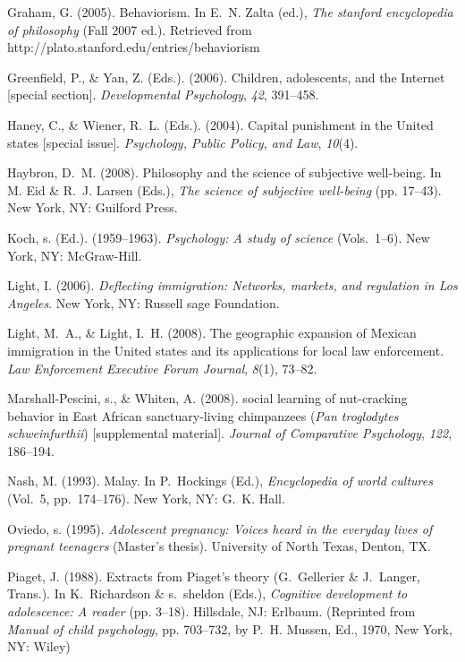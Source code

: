 \documentclass[]{interact}
\theoremstyle{plain}%
\theoremstyle{definition}
\theoremstyle{remark}
\begin{document}
\begin{thebibliography}{}
Graham, G. (2005). Behaviorism. In E.~N. Zalta (ed.), \emph{The stanford
 encyclopedia of philosophy} (Fall 2007 ed.). Retrieved from
 http://plato.stanford.edu/entries/behaviorism

Greenfield, P., \& Yan, Z. (Eds.). (2006). Children, adolescents, and the
 Internet [special section]. \emph{Developmental Psychology}, \emph{42},
 391--458.

Haney, C., \& Wiener, R.~L. (Eds.). (2004). Capital punishment in the United
 states [special issue]. \emph{Psychology, Public Policy, and Law},
 \emph{10}(4).

Haybron, D.~M. (2008). Philosophy and the science of subjective well-being. In
 M. Eid \& R.~J. Larsen (Eds.), \emph{The science of subjective well-being}
 (pp. 17--43). New York, NY: Guilford Press.

Koch, s. (Ed.). (1959--1963). \emph{Psychology: A study of science}
 (Vols.~1--6). New York, NY: McGraw-Hill.

Light, I. (2006). \emph{Deflecting immigration: Networks, markets, and
 regulation in Los Angeles}. New York, NY: Russell sage Foundation.

Light, M.~A., \& Light, I.~H. (2008). The geographic expansion of Mexican
 immigration in the United states and its applications for local law
 enforcement. \emph{Law Enforcement Executive Forum Journal}, \emph{8}(1),
 73--82.

Marshall-Pescini, s., \& Whiten, A. (2008). social learning of nut-cracking
 behavior in East African sanctuary-living chimpanzees (\emph{Pan troglodytes
 schweinfurthii}) [supplemental material]. \emph{Journal of Comparative
 Psychology}, \emph{122}, 186--194.

Nash, M. (1993). Malay. In P.~Hockings (Ed.), \emph{Encyclopedia of world
 cultures} (Vol.~5, pp.~174--176). New York, NY: G.~K. Hall.

Oviedo, s. (1995). \emph{Adolescent pregnancy: Voices heard in the everyday
 lives of pregnant teenagers} (Master's thesis). University of North Texas,
 Denton, TX.

Piaget, J. (1988). Extracts from Piaget's theory (G.~Gellerier \& J.~Langer,
 Trans.). In K.~Richardson \& s.~sheldon (Eds.), \emph{Cognitive development
 to adolescence: A reader} (pp. 3--18). Hillsdale, NJ: Erlbaum. (Reprinted
 from \emph{Manual of child psychology}, pp. 703--732, by P.~H. Mussen, Ed.,
 1970, New York, NY: Wiley)


\end{thebibliography}
\end{document}
